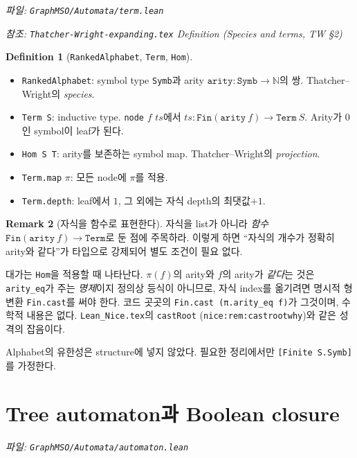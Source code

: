 \documentclass[11pt]{article}
\theoremstyle{definition}
\newtheorem{definition}{Definition}[section]
\newtheorem{remark}[definition]{Remark}
\theoremstyle{plain}
\newcommand{\lean}[1]{\texttt{#1}}
\newcommand{\leanfile}[1]{\texttt{#1}}
\newcommand{\TW}{Thatcher--Wright}
\begin{document}
\emph{파일: \leanfile{GraphMSO/Automata/term.lean}}

\emph{참조: \leanfile{Thatcher-Wright-expanding.tex} Definition (Species and
terms, TW \S2)}

\begin{definition}[\lean{RankedAlphabet}, \lean{Term}, \lean{Hom}]
\label{aut:def:rankedalphabet}
\begin{itemize}
  \item \lean{RankedAlphabet}: symbol type \lean{Symb}과 arity
    $\lean{arity} : \lean{Symb} \to \mathbb{N}$의 쌍. \TW{}의 \emph{species}.
  \item \lean{Term S}: inductive type. \lean{node} $f$ $ts$에서
    $ts : \lean{Fin}(\lean{arity}\ f) \to \lean{Term}\ S$. Arity가 $0$인
    symbol이 leaf가 된다.
  \item \lean{Hom S T}: arity를 보존하는 symbol map. \TW{}의
    \emph{projection}.
  \item \lean{Term.map} $\pi$: 모든 node에 $\pi$를 적용.
  \item \lean{Term.depth}: leaf에서 $1$, 그 외에는 자식 depth의 최댓값$+1$.
\end{itemize}
\end{definition}

\begin{remark}[자식을 함수로 표현한다]
\label{aut:rem:childrenasfunction}
자식을 list가 아니라 \emph{함수} $\lean{Fin}(\lean{arity}\ f) \to \lean{Term}$로
둔 점에 주목하라. 이렇게 하면 ``자식의 개수가 정확히 arity와 같다''가 타입으로
강제되어 별도 조건이 필요 없다.

대가는 \lean{Hom}을 적용할 때 나타난다. $\pi(f)$의 arity와 $f$의 arity가
\emph{같다}는 것은 \lean{arity\_eq}가 주는 \emph{명제}이지 정의상 등식이
아니므로, 자식 index를 옮기려면 명시적 형변환 \lean{Fin.cast}를 써야 한다.
코드 곳곳의 \lean{Fin.cast (π.arity\_eq f)}가 그것이며, 수학적 내용은 없다.
\leanfile{Lean\_Nice.tex}의 \lean{castRoot}
(\lean{nice:rem:castrootwhy})와 같은 성격의 잡음이다.

Alphabet의 유한성은 structure에 넣지 않았다. 필요한 정리에서만
\lean{[Finite S.Symb]}를 가정한다.
\end{remark}

\section{Tree automaton과 Boolean closure}
\label{aut:sec:automaton}

\emph{파일: \leanfile{GraphMSO/Automata/automaton.lean}}
\end{document}
